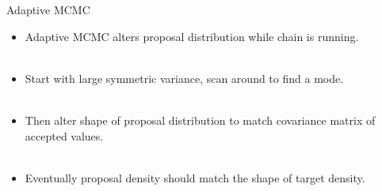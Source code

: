 \documentclass[compress]{beamer}
\begin{document}
\begin{frame}[label=sec-8-6]{Adaptive MCMC}
\begin{itemize}
\item \alert{Adaptive MCMC} alters proposal distribution while chain is running. \\~\\
\item Start with large symmetric variance, scan around to find a mode. \\~\\
\item Then alter shape of proposal distribution to match covariance matrix of accepted values.\\~\\
\item Eventually proposal density should match the shape of target density.\\~\\
\end{itemize}
\end{frame}
\end{document}
